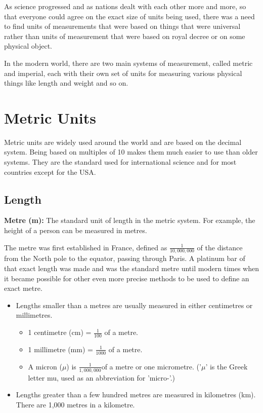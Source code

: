 \documentclass{article}
\begin{document}
As science progressed and as nations dealt with each other more and more, so that everyone could agree on the exact size of units being used, there was a need to find units of measurements that were based on things that were universal rather than units of measurement that were based on royal decree or on some physical object.

In the modern world, there are two main systems of measurement, called metric and imperial, each with their own set of units for measuring various physical things like length and weight and so on.

\section*{Metric Units}
Metric units are widely used around the world and are based on the decimal system. Being based on multiples of 10 makes them much easier to use than older systems. They are the standard used for international science and for most countries except for the USA.

\subsection*{Length}
\textbf{Metre (m):} The standard unit of length in the metric system. For example, the height of a person can be measured in metres.

The metre was first established in France, defined as $\frac{1}{10,000,000}$ of the distance from the North pole to the equator, passing through Paris. A platinum bar of that exact length was made and was the standard metre until modern times when it became possible for other even more precise methods to be used to define an exact metre.

\begin{itemize}
\item Lengths smaller than a metres are usually measured in either centimetres or millimetres.
  \begin{itemize}
  \item 1 centimetre (cm) = $\frac{1}{100}$ of a metre.
  \item 1 millimetre (mm) = $\frac{1}{1000}$ of a metre.
  \item A micron ($\mu$) is $\frac{1}{1,000,000}$of a metre or one micrometre. (’$\mu$’ is the Greek letter mu, used as an abbreviation for ’micro-’.)
\end{itemize}
\item Lengths greater than a few hundred metres are measured in kilometres (km). There are 1,000 metres in a kilometre.
\end{itemize}
\end{document}
